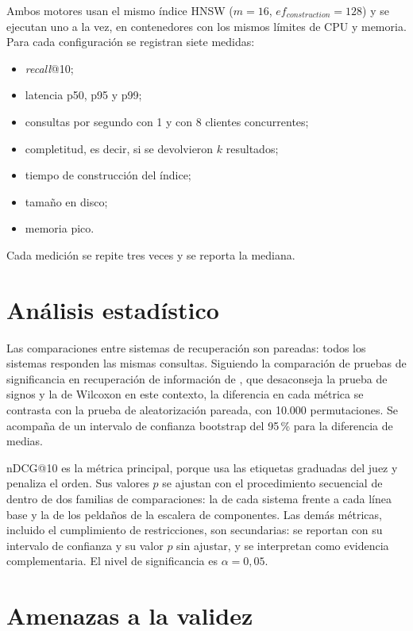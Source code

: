 Ambos motores usan el mismo índice HNSW ($m=16$, $ef_{construction}=128$) y se ejecutan uno a la vez, en contenedores con los mismos límites de CPU y memoria. Para cada configuración se registran siete medidas:
\begin{itemize}
    \item \textit{recall}@10;
    \item latencia p50, p95 y p99;
    \item consultas por segundo con 1 y con 8 clientes concurrentes;
    \item completitud, es decir, si se devolvieron $k$ resultados;
    \item tiempo de construcción del índice;
    \item tamaño en disco;
    \item memoria pico.
\end{itemize}
Cada medición se repite tres veces y se reporta la mediana.

\section{Análisis estadístico}
\label{sec:met-estadistica}

Las comparaciones entre sistemas de recuperación son pareadas: todos los sistemas responden las mismas consultas. Siguiendo la comparación de pruebas de significancia en recuperación de información de \citet{Smucker2007}, que desaconseja la prueba de signos y la de Wilcoxon en este contexto, la diferencia en cada métrica se contrasta con la prueba de aleatorización pareada, con 10.000 permutaciones. Se acompaña de un intervalo de confianza bootstrap del 95\,\% para la diferencia de medias.

nDCG@10 es la métrica principal, porque usa las etiquetas graduadas del juez y penaliza el orden. Sus valores $p$ se ajustan con el procedimiento secuencial de \citet{Holm1979} dentro de dos familias de comparaciones: la de cada sistema frente a cada línea base y la de los peldaños de la escalera de componentes. Las demás métricas, incluido el cumplimiento de restricciones, son secundarias: se reportan con su intervalo de confianza y su valor $p$ sin ajustar, y se interpretan como evidencia complementaria. El nivel de significancia es $\alpha = 0{,}05$.

\section{Amenazas a la validez}
\label{sec:met-validez}

